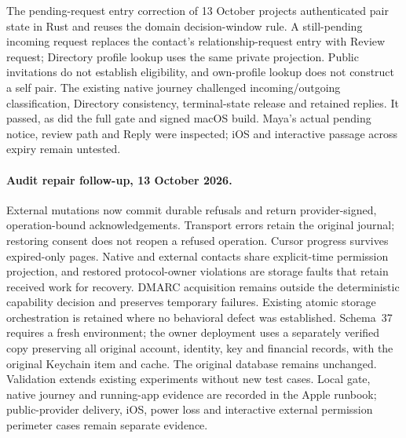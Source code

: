 \documentclass[11pt]{article}
\begin{document}
The pending-request entry correction of 13 October projects authenticated pair
state in Rust and reuses the domain decision-window rule. A still-pending incoming
request replaces the contact's relationship-request entry with Review request;
Directory profile lookup uses the same private projection. Public invitations do
not establish eligibility, and own-profile lookup does not construct a self pair.
The existing native journey challenged incoming/outgoing classification, Directory
consistency, terminal-state release and retained replies. It passed, as did the
full gate and signed macOS build. Maya's actual pending notice, review path and
Reply were inspected; iOS and interactive passage across expiry remain untested.

\paragraph{Audit repair follow-up, 13 October 2026.}
External mutations now commit durable refusals and return provider-signed,
operation-bound acknowledgements. Transport errors retain the original journal;
restoring consent does not reopen a refused operation. Cursor progress survives
expired-only pages. Native and external contacts share explicit-time permission
projection, and restored protocol-owner violations are storage faults that retain
received work for recovery. DMARC acquisition remains outside the deterministic
capability decision and preserves temporary failures. Existing atomic storage
orchestration is retained where no behavioral defect was established.
Schema~37 requires a fresh environment; the owner deployment uses a separately
verified copy preserving all original account, identity, key and financial records,
with the original Keychain item and cache. The original database remains unchanged.
Validation extends existing experiments without new test cases. Local gate,
native journey and running-app evidence are recorded in the Apple runbook;
public-provider delivery, iOS, power loss and interactive external permission
perimeter cases remain separate evidence.
\end{document}
